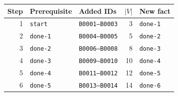 \begin{tabular}{rllrl}
\toprule
Step & Prerequisite & Added IDs & $|V|$ & New fact\\\midrule
1 & \texttt{start} & \texttt{B0001--B0003} & 3 & \texttt{done-1}\\
2 & \texttt{done-1} & \texttt{B0004--B0005} & 5 & \texttt{done-2}\\
3 & \texttt{done-2} & \texttt{B0006--B0008} & 8 & \texttt{done-3}\\
4 & \texttt{done-3} & \texttt{B0009--B0010} & 10 & \texttt{done-4}\\
5 & \texttt{done-4} & \texttt{B0011--B0012} & 12 & \texttt{done-5}\\
6 & \texttt{done-5} & \texttt{B0013--B0014} & 14 & \texttt{done-6}\\
\bottomrule
\end{tabular}
